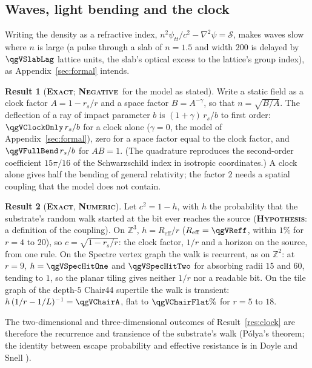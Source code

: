 \documentclass[11pt]{article}
\newcommand{\exact}{\textbf{\textsc{Exact}}}
\newcommand{\numeric}{\textbf{\textsc{Numeric}}}
\newcommand{\hypo}{\textbf{\textsc{Hypothesis}}}
\newcommand{\negres}{\textbf{\textsc{Negative}}}
\theoremstyle{definition}
\newtheorem{result}{Result}
\begin{document}
\subsection{Waves, light bending and the clock}\label{sec:second-gravity}
Writing the density as a refractive index, $n^2\psi_{tt}/c^2-\nabla^2\psi=\mathcal{S}$, makes waves slow where $n$ is large (a pulse through a slab of $n=1.5$ and width $200$ is delayed by $\qgVSlabLag$ lattice units, the slab's optical excess to the lattice's group index), as Appendix~\ref{sec:formal} intends.
\begin{result}[\exact; \negres\ for the model as stated]\label{res:bend}
Write a static field as a clock factor $A=1-r_s/r$ and a space factor $B=A^{-\gamma}$, so that $n=\sqrt{B/A}$. The deflection of a ray of impact parameter $b$ is $(1+\gamma)\,r_s/b$ to first order: $\qgVClockOnly\,r_s/b$ for a clock alone ($\gamma=0$, the model of Appendix~\ref{sec:formal}), zero for a space factor equal to the clock factor, and $\qgVFullBend\,r_s/b$ for $AB=1$. (The quadrature reproduces the second-order coefficient $15\pi/16$ of the Schwarzschild index in isotropic coordinates.) A clock alone gives half the bending of general relativity; the factor $2$ needs a spatial coupling that the model does not contain.
\end{result}
\begin{result}[\exact, \numeric]\label{res:escape}
Let $c^2=1-h$, with $h$ the probability that the substrate's random walk started at the bit ever reaches the source (\hypo: a definition of the coupling). On $\mathbb{Z}^3$, $h=R_{\mathrm{eff}}/r$ ($R_{\mathrm{eff}}=\qgVReff$, within $1\%$ for $r=4$ to $20$), so $c=\sqrt{1-r_s/r}$: the clock factor, $1/r$ and a horizon on the source, from one rule. On the Spectre vertex graph the walk is recurrent, as on $\mathbb{Z}^2$: at $r=9$, $h=\qgVSpecHitOne$ and $\qgVSpecHitTwo$ for absorbing radii $15$ and $60$, tending to $1$, so the planar tiling gives neither $1/r$ nor a readable bit. On the tile graph of the depth-$5$ Chair44 supertile the walk is transient: $h\,(1/r-1/L)^{-1}=\qgVChairA$, flat to $\qgVChairFlat\%$ for $r=5$ to $18$.
\end{result}
The two-dimensional and three-dimensional outcomes of Result~\ref{res:clock} are therefore the recurrence and transience of the substrate's walk (P\'olya's theorem; the identity between escape probability and effective resistance is in Doyle and Snell \cite{doylesnell1984}).
\end{document}
